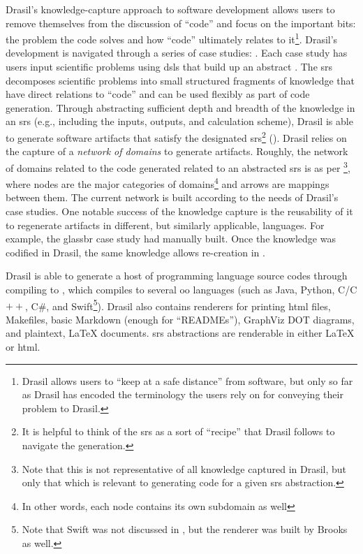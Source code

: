 \caseStudiesTable{}

Drasil's knowledge-capture approach to software development allows users to
remove themselves from the discussion of ``code'' and focus on the important
bits: the problem the code solves and how ``code'' ultimately relates to
it\footnote{Drasil allows users to ``keep at a safe distance'' from software,
but only so far as Drasil has encoded the terminology the users rely on for
conveying their problem to Drasil.}. Drasil's development is navigated through a
series of case studies: . Each case study has users input
scientific problems using \acsp{dsl} that build up an abstract 
\cite{SmithAndLai2005}. The \acs{srs} decomposes scientific problems into small
structured fragments of knowledge that have direct relations to ``code'' and can
be used flexibly as part of code generation. Through abstracting sufficient
depth and breadth of the knowledge in an \acs{srs} (e.g., including the inputs,
outputs, and calculation scheme), Drasil is able to generate software artifacts
that satisfy the designated \acs{srs}\footnote{It is helpful to think of the
\acs{srs} as a sort of ``recipe'' that Drasil follows to navigate the
generation.} (). Drasil relies on the capture of a
\textit{network of domains} \cite{Czarnecki2005} to generate artifacts. Roughly,
the network of domains related to the code generated related to an abstracted
\acs{srs} is as per \footnote{Note that this is not
representative of all knowledge captured in Drasil, but only that which is
relevant to generating code for a given \acs{srs} abstraction.}, where nodes are
the major categories of domains\footnote{In other words, each node contains its
own subdomain as well} and arrows are mappings between them. The current network
is built according to the needs of Drasil's case studies. One notable success of
the knowledge capture is the reusability of it to regenerate artifacts in
different, but similarly applicable, languages. For example, the \acs{glassbr}
case study had 
manually built. Once the knowledge was codified in Drasil, the same knowledge
allows re-creation in .

\roughNetworkOfDomains{}

Drasil is able to generate a host of  programming language source codes
through compiling to  \cite{Carette2019,MacLachlan2020}, which
compiles to several \acs{oo} languages (such as Java, Python, C/C$++$, C\#, and
Swift\footnote{Note that Swift was not discussed in \cite{MacLachlan2020}, but
      the renderer was built by Brooks as well.}). Drasil also contains renderers for
printing \acs{html} files, Makefiles, basic Markdown (enough for ``READMEs''),
GraphViz DOT \cite{Gansner1993} diagrams, and plaintext, \LaTeX{} documents.
\acs{srs} abstractions are renderable in either \LaTeX{} or \acs{html}.

